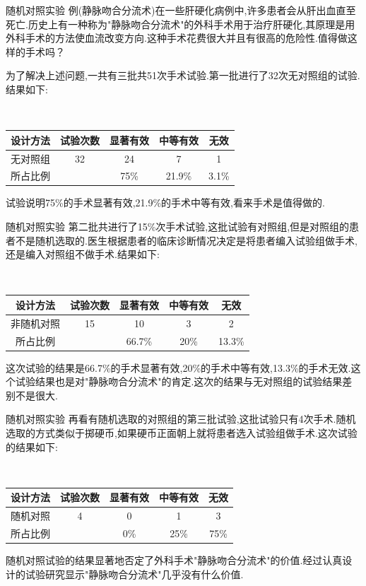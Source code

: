 	\begin{frame}{随机对照实验}
		例(静脉吻合分流术)在一些肝硬化病例中,许多患者会从肝出血直至死亡.历史上有一种称为"静脉吻合分流术"的外科手术用于治疗肝硬化,其原理是用外科手术的方法使血流改变方向.这种手术花费很大并且有很高的危险性.值得做这样的手术吗？
		
		为了解决上述问题,一共有三批共51次手术试验.第一批进行了32次无对照组的试验.结果如下:
		
		$\quad\quad\quad\quad$\begin{tabular}{|c|c|c|c|c|}
			\hline 设计方法 & 试验次数 & 显著有效 & 中等有效 & 无效\\
			\hline 无对照组 & 32 & 24 & 7 & 1\\
			\hline 所占比例 &    & 75\% & 21.9\% & 3.1\% \\
			\hline
		\end{tabular}
	
		试验说明75\%的手术显著有效,21.9\%的手术中等有效,看来手术是值得做的.
	\end{frame}
	
	\begin{frame}{随机对照实验}
		第二批共进行了15\%次手术试验,这批试验有对照组,但是对照组的患者不是随机选取的.医生根据患者的临床诊断情况决定是将患者编入试验组做手术,还是编入对照组不做手术.结果如下:
		
		$\quad\quad\quad\quad$\begin{tabular}{|c|c|c|c|c|}
			\hline 设计方法 & 试验次数 & 显著有效 & 中等有效 & 无效\\
			\hline 非随机对照 & 15 & 10 & 3 & 2\\
			\hline 所占比例 &    & 66.7\% & 20\% & 13.3\% \\
			\hline
		\end{tabular}
	
		这次试验的结果是66.7\%的手术显著有效,20\%的手术中等有效,13.3\%的手术无效.这个试验结果也是对"静脉吻合分流术"的肯定.这次的结果与无对照组的试验结果差别不是很大.
	\end{frame}
	
	\begin{frame}{随机对照实验}
		再看有随机选取的对照组的第三批试验,这批试验只有4次手术.随机选取的方式类似于掷硬币,如果硬币正面朝上就将患者选入试验组做手术.这次试验的结果如下:
		
		$\quad\quad\quad\quad$\begin{tabular}{|c|c|c|c|c|}
			\hline 设计方法 & 试验次数 & 显著有效 & 中等有效 & 无效\\
			\hline 随机对照 & 4 & 0 & 1 & 3\\
			\hline 所占比例 &    & 0\% & 25\% & 75\% \\
			\hline
		\end{tabular}
	
		随机对照试验的结果显著地否定了外科手术"静脉吻合分流术"的价值.经过认真设计的试验研究显示"静脉吻合分流术"几乎没有什么价值.
	\end{frame}
	
